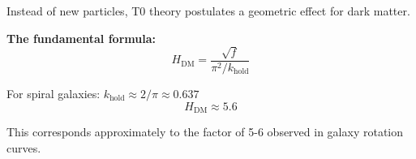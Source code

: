 	Instead of new particles, T0 theory postulates a geometric effect for dark matter.
	
	\textbf{The fundamental formula:}
	\begin{equation}
		\boxed{H_{\text{DM}} = \frac{\sqrt{f}}{\pi^2/k_{\text{hold}}}}
	\end{equation}
	
	For spiral galaxies: \(k_{\text{hold}} \approx 2/\pi \approx 0.637\)
	\begin{equation}
		H_{\text{DM}} \approx 5.6
	\end{equation}
	
	This corresponds approximately to the factor of 5-6 observed in galaxy rotation curves.
